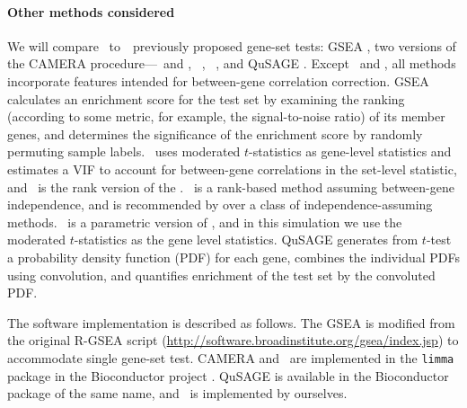 	
	\paragraph{Other methods considered}
	
	We will compare \OurMethod~to~\HowmanyTest~previously proposed gene-set tests: GSEA
	\citep{subramanian2005gene}, two versions of the CAMERA \citep{wu2012camera} 
	procedure---\CMT~and
	\CMR, \gent~\citep{tian2005discovering}, 
	\genr~\citep{michaud2008integrative}, and QuSAGE \citep{yaari2013quantitative}. Except 
	\gent~and \genr, all methods incorporate features intended for between-gene correlation 
	correction. GSEA calculates an enrichment score for the test set by examining the ranking 
	(according to some metric, for example, the signal-to-noise ratio) of its member genes, and 
	determines the significance of the enrichment
	score by randomly permuting sample labels. \CMT~uses moderated $t$-statistics 
	\citep{Smyth2004moderated} as gene-level statistics and estimates a VIF to account for 
	between-gene correlations in the set-level statistic, and \CMR~is the rank version of the \CMT.
	\genr~is a rank-based method assuming between-gene independence, and is recommended by 
	\citet{tarca2013comparison} over a class of independence-assuming methods. \gent~is a 
	parametric version of \genr, and in this simulation we use the moderated $t$-statistics as the 
	gene level statistics. 
	QuSAGE generates from $t$-test a probability density function (PDF) for each gene, combines the 
	individual PDFs using convolution, and quantifies enrichment of the test set by the convoluted 
	PDF. 
	
	
	The software implementation is described as follows. The GSEA is modified from the original 
	R-GSEA script (\url{http://software.broadinstitute.org/gsea/index.jsp}) to accommodate single 
	gene-set test. CAMERA and \genr~are implemented in the \verb|limma| package 
	\citep{smyth2005limma} in the Bioconductor project \citep{gentleman2004bioconductor}. QuSAGE is 
	available in the Bioconductor package of the same name, and \gent~is implemented by ourselves. 
	

